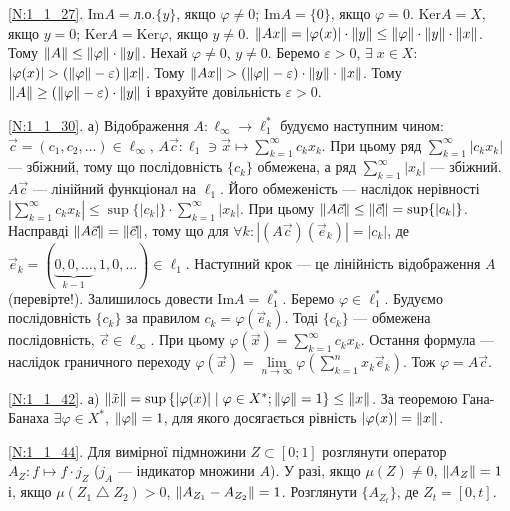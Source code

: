 \noindent\ref{N:1_1_27}. $\mathrm{Im}A = \text{л.о.}\{y\}$, якщо $\varphi \neq 0$;
$\mathrm{Im}A = \{0\}$, якщо $\varphi = 0$. $\mathrm{Ker}A = X$, якщо $y = 0$;
$\mathrm{Ker}A = \mathrm{Ker}\varphi$, якщо $y \neq 0$.
$\left\lVert Ax\right\rVert = |\varphi(x)|\cdot \left\lVert y\right\rVert \leq \left\lVert\varphi\right\rVert\cdot\left\lVert y\right\rVert\cdot\left\lVert x\right\rVert$.
Тому $\left\lVert A\right\rVert \leq \left\lVert\varphi\right\rVert\cdot\left\lVert y\right\rVert$. Нехай $\varphi \neq 0$, $y \neq 0$.
Беремо $\varepsilon > 0$, $\exists\; x \in X$: $|\varphi(x)| > (\left\lVert\varphi\right\rVert-\varepsilon)
\left\lVert x\right\rVert$. Тому $\left\lVert Ax\right\rVert > (\left\lVert\varphi\right\rVert-\varepsilon)\cdot\left\lVert y\right\rVert\cdot\left\lVert x\right\rVert$.
Тому $\left\lVert A\right\rVert \geq (\left\lVert\varphi\right\rVert-\varepsilon)\cdot\left\lVert y\right\rVert$ і врахуйте довільність 
$\varepsilon>0$.

\noindent\ref{N:1_1_30}. а) Відображення $A: \ell_\infty \to \ell_1^*$
будуємо наступним чином: $\vec{c} = (c_1,c_2,\dots) \in \ell_\infty$,
$A\vec{c}: \ell_1 \ni \vec{x} \mapsto \sum\limits^\infty_{k=1} c_k x_k$.
При цьому ряд $\sum\limits^\infty_{k=1} |c_k x_k|$ --- збіжний, тому що послідовність
$\{c_k\}$ обмежена, а ряд $\sum\limits^\infty_{k=1} |x_k|$ --- збіжний.
$A\vec{c}$ --- лінійний функціонал на $\ell_1$. Його обмеженість --- наслідок нерівності
$|\sum\limits^\infty_{k=1} c_k x_k| \leq \sup\{|c_k|\} \cdot \sum\limits^\infty_{k=1} |x_k|$.
При цьому $\left\lVert A \vec{c}\right\rVert \leq \left\lVert\vec{c}\right\rVert = \sup\{|c_k|\}$. Насправді 
$\left\lVert A \vec{c}\right\rVert = \left\lVert\vec{c}\right\rVert$, тому що для $\forall k: |(A \vec{c})(\vec{e}_k)| = |c_k|$,
де $\vec{e}_k = (\underbrace{0,0,\dots}_{k-1},1,0,\dots) \in \ell_1$.
Наступний крок --- це лінійність відображення $A$ (перевірте!). Залишилось довести
$\mathrm{Im}A = \ell_1^*$. Беремо $\varphi\in \ell_1^*$. Будуємо послідовність $\{c_k\}$
за правилом $c_k = \varphi(\vec{e}_k)$. Тоді $\{c_k\}$ --- обмежена послідовність, 
$\vec{c} \in \ell_\infty$. При цьому $\varphi(\vec{x}) = \sum\limits^\infty_{k=1} c_k x_k$.
Остання формула --- наслідок граничного переходу $\varphi(\vec{x}) = 
\underset{n\to \infty}{\lim} \varphi\left(\sum\limits^n_{k=1} x_k \vec{e}_k\right)$.
Тож $\varphi = A \vec{c}$.

\noindent\ref{N:1_1_42}. а) $\left\lVert\tilde{x}\right\rVert = \sup\left\{|\varphi(x)| \mid
\varphi\in X^*; \left\lVert\varphi\right\rVert=1\right\} \leq \left\lVert x\right\rVert$. За теоремою Гана-Банаха 
$\exists\varphi\in X^*$, $\left\lVert\varphi\right\rVert = 1$, для якого досягається рівність
$|\varphi(x)| = \left\lVert x\right\rVert$.

\noindent\ref{N:1_1_44}. Для вимірної підмножини $Z \subset [0; 1]$ розглянути оператор
$A_Z: f \mapsto f \cdot j_Z$ ($j_A$ --- індикатор множини $A$). У разі, якщо $\mu(Z) \neq 0$, 
$\left\lVert A_Z\right\rVert = 1$ і, якщо $\mu (Z_1 \bigtriangleup Z_2) > 0$, $\left\lVert A_{Z_1} - A_{Z_2}\right\rVert = 1$.
Розглянути $\{A_{Z_t}\}$, де $Z_t = [0, t]$.

